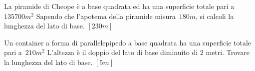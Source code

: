 \begin{multicols}{2}
\begin{esercizio}[\Ast]
 \label{ese:3.149}
La piramide di Cheope è a base quadrata ed ha una superficie totale pari a
\( 135700\unit{m^2}\) Sapendo che l'apotema della piramide 
misura~\(180\unit{m}\), 
si calcoli la lunghezza del lato di base.
\hfill\(\left[230\unit{m}\right]\)
\end{esercizio}

\begin{esercizio}[\Ast]
 \label{ese:3.150}
Un container a forma di parallelepipedo a base quadrata ha una superficie
totale pari a~\(210\unit{m^2}\) L'altezza è il doppio del lato di base 
diminuito 
di \(2\) metri. Trovare la lunghezza del lato di base.
\hfill\(\left[5\unit{m}\right]\)
\end{esercizio}

\begin{comment}

\subsection*{3.10 - Problemi con un parametro}

\begin{esercizio}
 \label{ese:3.151}
Sul prolungamento dei lati~\(AB\),~\(BC\),~\(CD\),~\(DA\) del 
quadrato~\(ABCD\) 
prendi rispettivamente i punti\( Q\),\( R\),\( S\),~\(P\) in modo che\( 
QB=RC=SD=PA~\)Dimostra che~\(PQRS\) è un quadrato;~ nell'ipotesi che 
sia\(AB 
= 
3\unit{m}\) determina\(\overline {AP}\) in modo che l'area di~\(PQRS\) 
sia\( 
k\), 
con\( k\) reale positivo.
\begin{center}
 
\end{center}
\emph{Svolgimento}:
per dimostrare che~\(PQRS\) è un quadrato dobbiamo dimostrare che i lati 
sono
congruenti e che gli angoli sono retti. Se si pone\(\overline{AP} = x\) 
con\(x > 
0\)
\(\Area(PQRS)= \overline {PQ}^{2} = \overline {PA}^{2} + 
\overline{AQ}^{2}\)per il 
teorema di Pitagora.
Verifica che si ottiene l'equazione risolvente\(2 x^{2} + 6 x + (9-k) = 
0\) 
Poiché vogliamo soluzioni reali positive, discuti l'equazione con il 
metodo di 
Cartesio. Il discriminante è\(\Delta = 36-8 (9-k)\) pertanto l'equazione 
ammette 
soluzioni reali per\(k \geq \dfrac{9}{2}~\)Dal segno dei coefficienti, 
essendo i 
primi due coefficienti positivi si ha una permanenza e quindi una radice 
negativa che non è accettabile. Per ottenere una soluzione positiva ci 
deve 
essere una variazione di segno negli ultimi due coefficienti, in altre 
parole 
\(9-k\) deve essere negativo cioè\(9-k < 0 \rightarrow k > 9~\)Pertanto 
il 
problema 
ha soluzioni per\(k > 9\)
\end{esercizio}


\end{comment}
\end{multicols}
